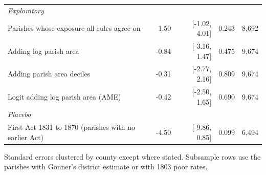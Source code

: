 \documentclass[11pt,a4paper]{article}
\begin{document}
\begin{table}[tbp]
\begin{tabular}{p{7.6cm}rrrr}
\multicolumn{5}{l}{\textit{Exploratory}}\\
Parishes whose exposure all rules agree on & 1.50 & [-1.02, 4.01] & 0.243 & 8,692\\
Adding log parish area & -0.84 & [-3.16, 1.47] & 0.475 & 9,674\\
Adding parish area deciles & -0.31 & [-2.77, 2.16] & 0.809 & 9,674\\
Logit adding log parish area (AME) & -0.42 & [-2.50, 1.65] & 0.690 & 9,674\\
\multicolumn{5}{l}{\textit{Placebo}}\\
First Act 1831 to 1870 (parishes with no earlier Act) & -4.50 & [-9.86, 0.85] & 0.099 & 6,494\\
\bottomrule\end{tabular}\par\vspace{4pt}\parbox{\textwidth}{\footnotesize Standard errors clustered by county except where stated. Subsample rows use the parishes with Gonner's district estimate or with 1803 poor rates.}\end{table}
\end{document}
